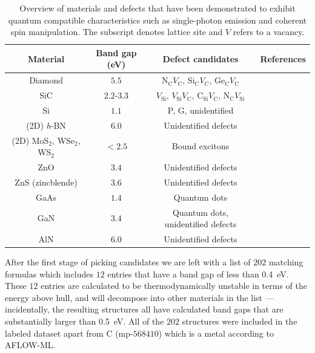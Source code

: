 \documentclass[superscriptaddress,
preprint,
 amsmath,amssymb,
 aps,
]{revtex4-2}
\begin{document}
\begin{table}[t]
    \centering 
    \caption{Overview of materials and defects that have been demonstrated to exhibit quantum  compatible characteristics such as single-photon emission and coherent spin manipulation. The subscript denotes lattice site and $V$ refers to a vacancy. }
    \begin{tabular}{c|c|c|c}
    Material & Band gap (\si{\electronvolt}) & Defect candidates & References \\
    \hline
    Diamond  & $5.5$  & N$_\mathrm{C}V_\mathrm{C}$, Si$_\mathrm{C}V_\mathrm{C}$, Ge$_\mathrm{C}V_\mathrm{C}$ & \cite{Taylor2008,Balasubramanian_2009,Barclay2011,Gordon2013,Rogers_2014,Bhaskar_2018} \\ 
    SiC & $2.2$-$3.3$ & $V_\mathrm{Si}$, $V_\mathrm{Si}V_\mathrm{C}$, C$_\mathrm{Si}V_\mathrm{C}$, N$_\mathrm{C}V_\mathrm{Si}$ & \cite{Widmann2014,Christle_2015,Castelletto_2014,Zargaleh_2018}  \cite{Weber2010, Son2020, Falk2013} \\ 
    Si & $1.1$ & P, G, unidentified & \cite{Muhonen_2014,Durand_2020,Redjem2020} \\ 
    (2D) \textit{h}-BN & $6.0$ & Unidentified defects & \cite{Tran_2016,Tran_2016b,Hayee_2020} \\ 
    (2D) MoS$_2$, WSe$_2$, WS$_2$ & $<2.5$ & Bound excitons & \cite{Toth2019} \\
    ZnO & $3.4$ & Unidentified defects & \cite{Morfa2012} \\ 
    ZnS (zincblende) & $3.6$ & Unidentified defects & \cite{Stewart2019} \\ 
    GaAs & $1.4$ & Quantum dots & \cite{Bluhm2010} \\ 
    GaN & $3.4$ & Quantum dots, unidentified defects & \cite{Roux2017,Berhane2018} \\
    AlN & $6.0$ & Unidentified defects & \cite{Xue2020}\\
    \end{tabular}
    \label{tab:qt-materials}
\end{table} 

After the first stage of picking candidates we are left with a list of $202$ matching formulas which includes $12$ entries that have a band gap of less than \SI{0.4}{\electronvolt}.
These $12$ entries are calculated to be thermodynamically unstable in terms of the energy above hull, and will decompose into other materials in the list --- incidentally, the resulting structures all have calculated band gaps that are substantially larger than \SI{0.5}{\electronvolt}.
All of the $202$ structures were included in the labeled dataset apart from C (mp-$568410$) which is a metal according to AFLOW-ML.
 
\end{document}
